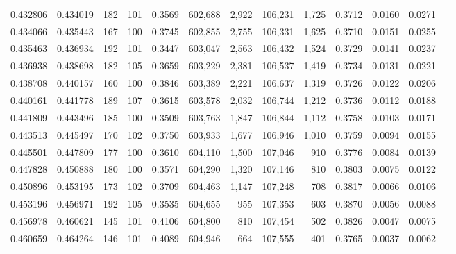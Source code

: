 \begin{tabular}{rrrrrrrrrrrrr}
0.432806 & 0.434019 &   182 & 101 &                                     0.3569 & 602,688 &   2,922 & 106,231 &   1,725 & 0.3712 & 0.0160 & 0.0271 \\
0.434066 & 0.435443 &   167 & 100 &                                     0.3745 & 602,855 &   2,755 & 106,331 &   1,625 & 0.3710 & 0.0151 & 0.0255 \\
0.435463 & 0.436934 &   192 & 101 &                                     0.3447 & 603,047 &   2,563 & 106,432 &   1,524 & 0.3729 & 0.0141 & 0.0237 \\
0.436938 & 0.438698 &   182 & 105 &                                     0.3659 & 603,229 &   2,381 & 106,537 &   1,419 & 0.3734 & 0.0131 & 0.0221 \\
0.438708 & 0.440157 &   160 & 100 &                                     0.3846 & 603,389 &   2,221 & 106,637 &   1,319 & 0.3726 & 0.0122 & 0.0206 \\
0.440161 & 0.441778 &   189 & 107 &                                     0.3615 & 603,578 &   2,032 & 106,744 &   1,212 & 0.3736 & 0.0112 & 0.0188 \\
0.441809 & 0.443496 &   185 & 100 &                                     0.3509 & 603,763 &   1,847 & 106,844 &   1,112 & 0.3758 & 0.0103 & 0.0171 \\
0.443513 & 0.445497 &   170 & 102 &                                     0.3750 & 603,933 &   1,677 & 106,946 &   1,010 & 0.3759 & 0.0094 & 0.0155 \\
0.445501 & 0.447809 &   177 & 100 &                                     0.3610 & 604,110 &   1,500 & 107,046 &     910 & 0.3776 & 0.0084 & 0.0139 \\
0.447828 & 0.450888 &   180 & 100 &                                     0.3571 & 604,290 &   1,320 & 107,146 &     810 & 0.3803 & 0.0075 & 0.0122 \\
0.450896 & 0.453195 &   173 & 102 &                                     0.3709 & 604,463 &   1,147 & 107,248 &     708 & 0.3817 & 0.0066 & 0.0106 \\
0.453196 & 0.456971 &   192 & 105 &                                     0.3535 & 604,655 &     955 & 107,353 &     603 & 0.3870 & 0.0056 & 0.0088 \\
0.456978 & 0.460621 &   145 & 101 &                                     0.4106 & 604,800 &     810 & 107,454 &     502 & 0.3826 & 0.0047 & 0.0075 \\
0.460659 & 0.464264 &   146 & 101 &                                     0.4089 & 604,946 &     664 & 107,555 &     401 & 0.3765 & 0.0037 & 0.0062 \\

\end{tabular}
